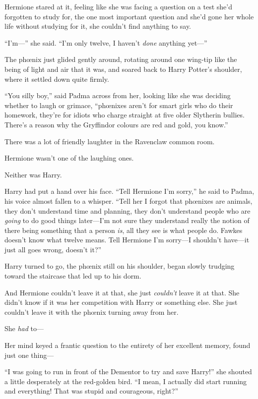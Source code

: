 Hermione stared at it, feeling like she was facing a question on a test she’d forgotten to study for, the one most important question and she’d gone her whole life without studying for it, she couldn’t find anything to say.

“I’m—” she said. “I’m only twelve, I haven’t \emph{done} anything yet—”

The phœnix just glided gently around, rotating around one wing-tip like the being of light and air that it was, and soared back to Harry Potter’s shoulder, where it settled down quite firmly.

“You silly boy,” said Padma across from her, looking like she was deciding whether to laugh or grimace, “phœnixes aren’t for smart girls who do their homework, they’re for idiots who charge straight at five older Slytherin bullies. There’s a reason why the Gryffindor colours are red and gold, you know.”

There was a lot of friendly laughter in the Ravenclaw common room.

Hermione wasn’t one of the laughing ones.

Neither was Harry.

Harry had put a hand over his face. “Tell Hermione I’m sorry,” he said to Padma, his voice almost fallen to a whisper. “Tell her I forgot that phœnixes are animals, they don’t understand time and planning, they don’t understand people who are \emph{going} to do good things later—I’m not sure they understand really the notion of there being something that a person \emph{is}, all they see is what people do. Fawkes doesn’t know what twelve means. Tell Hermione I’m sorry—I shouldn’t have—it just all goes wrong, doesn’t it?”

Harry turned to go, the phœnix still on his shoulder, began slowly trudging toward the staircase that led up to his dorm.

And Hermione couldn’t leave it at that, she just \emph{couldn’t} leave it at that. She didn’t know if it was her competition with Harry or something else. She just couldn’t leave it with the phœnix turning away from her.

She \emph{had} to—

Her mind keyed a frantic question to the entirety of her excellent memory, found just one thing—

“I was going to run in front of the Dementor to try and save Harry!” she shouted a little desperately at the red-golden bird. “I mean, I actually did start running and everything! That was stupid and courageous, right?”

